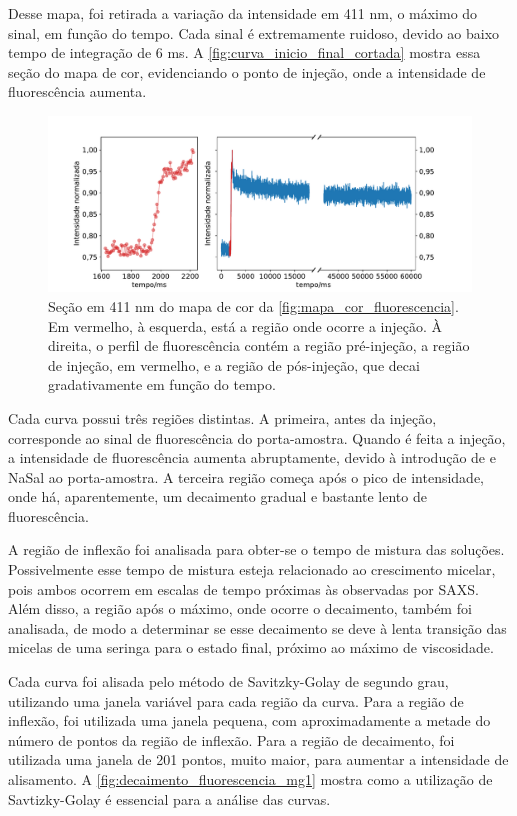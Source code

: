 	Desse mapa, foi retirada a variação da intensidade em 411 nm, o máximo do sinal, em função do tempo. Cada sinal é extremamente ruidoso, devido ao baixo tempo de integração de 6 ms.
	A \autoref{fig:curva_inicio_final_cortada} mostra essa seção do mapa de cor, evidenciando o ponto de injeção, onde a intensidade de fluorescência aumenta.
	
	\begin{figure}[h]
		\centering
		\includegraphics[width=\textwidth]{imagens/fluor/curva_inicio_final_cortada}
		\caption{Seção em 411 nm do mapa de cor da  \autoref{fig:mapa_cor_fluorescencia}. Em vermelho, à esquerda, está a região onde ocorre a injeção. À direita, o perfil de fluorescência contém a região pré-injeção, a região de injeção, em vermelho, e a região de pós-injeção, que decai gradativamente em função do tempo.}
		\label{fig:curva_inicio_final_cortada} 
	\end{figure}
	
	Cada curva possui três regiões distintas. A primeira, antes da injeção, corresponde ao sinal de fluorescência do porta-amostra. Quando é feita a injeção, a intensidade de fluorescência aumenta abruptamente, devido à introdução de \TTAB{} e NaSal ao porta-amostra. A terceira região começa após o pico de intensidade, onde há, aparentemente, um decaimento gradual e bastante lento de fluorescência.
	
	A região de inflexão foi analisada para obter-se o tempo de mistura das soluções. Possivelmente esse tempo de mistura esteja relacionado ao crescimento micelar, pois ambos ocorrem em escalas de tempo próximas às observadas por SAXS. Além disso, a região após o máximo, onde ocorre o decaimento, também foi analisada, de modo a determinar se esse decaimento se deve à lenta transição das micelas de uma seringa para o estado final, próximo ao máximo de viscosidade. 
	
	Cada curva foi alisada pelo método de Savitzky-Golay de segundo grau, utilizando uma janela variável para cada região da curva. Para a região de inflexão, foi utilizada uma janela pequena, com aproximadamente a metade do número de pontos da região de inflexão. Para a região de decaimento, foi utilizada uma janela de 201 pontos, muito maior, para aumentar a intensidade de alisamento. A \autoref{fig:decaimento_fluorescencia_mg1} mostra como a utilização de Savtizky-Golay é essencial para a análise das curvas. 

